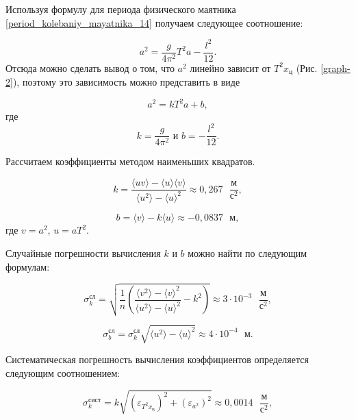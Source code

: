 \documentclass[a4paper,12pt]{article}
\begin{document}
Используя формулу для периода физического маятника \eqref{period_kolebaniy_mayatnika_14} получаем следующее соотношение:

\begin{equation}
a^2 = \frac{g}{4\pi^2}T^2a - \frac{l^2}{12}.
\end{equation}
Отсюда можно сделать вывод о том, что $ a^2 $ линейно зависит от $ T^2x_\text{ц} $ (Рис. \eqref{graph-2}), поэтому это зависимость можно представить в виде

\begin{equation}
a^2 = kT^2a + b,
\end{equation}
где
\begin{equation}\label{koef}
k=\frac{g}{4\pi^2}  \text{ и }  b = - \frac{l^2}{12}.
\end{equation}


Рассчитаем коэффициенты методом наименьших квадратов. 

\begin{equation}
k=\frac{\langle uv\rangle-\langle u\rangle \langle v\rangle}{\langle u^2\rangle - \langle u\rangle^2}\approx 0,267 \text{ }\frac{\text{м}}{\text{с}^2},
\end{equation}

\begin{equation}
b=\langle v \rangle -k\langle u \rangle\approx -0,0837\text{ }\text{м},
\end{equation}
где $ v=a^2 $, $ u=aT^2 $.

Случайные погрешности вычисления $ k $ и $ b $ можно найти по следующим формулам:

\begin{equation}
\sigma_k^\text{сл}=\sqrt{\frac{1}{n}\left(\frac{\langle v^2 \rangle - \langle v \rangle^2}{\langle u^2 \rangle - \langle u \rangle^2} - k^2 \right) } \approx 3 \cdot 10^{-3} \text{ }\frac{\text{м}}{\text{с}^2},
\end{equation}

\begin{equation}
\sigma_b^\text{сл}= \sigma_k^\text{сл} \sqrt{\langle u^2 \rangle - \langle u \rangle^2} \approx 4 \cdot 10^{-4} \text{ }\text{м}.
\end{equation}

Систематическая погрешность вычисления коэффициентов определяется следующим соотношением:

\begin{equation}
\sigma^\text{сист}_k = k\sqrt{\left( \varepsilon_{T^2x_\text{ц}} \right)^2 + \left( \varepsilon_{a^2} \right)^2 } \approx 0,0014 \text{ }\frac{\text{м}}{\text{с}^2},
\end{equation}
\end{document}
